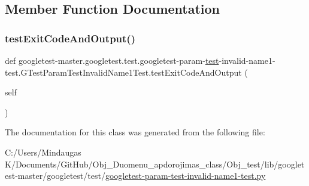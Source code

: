 \subsection{Member Function Documentation}
\mbox{\label{classgoogletest-master_1_1googletest_1_1test_1_1googletest-param-test-invalid-name1-test_1_1_g_tf880334fd9d35194c26b114edbd24da2_a9d776d597f244f947c3ba826fe86a8c2}} 
\subsubsection{\texorpdfstring{testExitCodeAndOutput()}{testExitCodeAndOutput()}}
{\footnotesize\ttfamily def googletest-\/master.\+googletest.\+test.\+googletest-\/param-\/\mbox{\hyperlink{_mutual_8h_a707ee03719e99670bf6cfdfd897b8456}{test}}-\/invalid-\/name1-\/test.\+G\+Test\+Param\+Test\+Invalid\+Name1\+Test.\+test\+Exit\+Code\+And\+Output (\begin{DoxyParamCaption}\item[{}]{self }\end{DoxyParamCaption})}



The documentation for this class was generated from the following file\+:\begin{DoxyCompactItemize}
\item 
C\+:/\+Users/\+Mindaugas K/\+Documents/\+Git\+Hub/\+Obj\+\_\+\+Duomenu\+\_\+apdorojimas\+\_\+class/\+Obj\+\_\+test/lib/googletest-\/master/googletest/test/\mbox{\hyperlink{_obj__test_2lib_2googletest-master_2googletest_2test_2googletest-param-test-invalid-name1-test_8py}{googletest-\/param-\/test-\/invalid-\/name1-\/test.\+py}}\end{DoxyCompactItemize}
